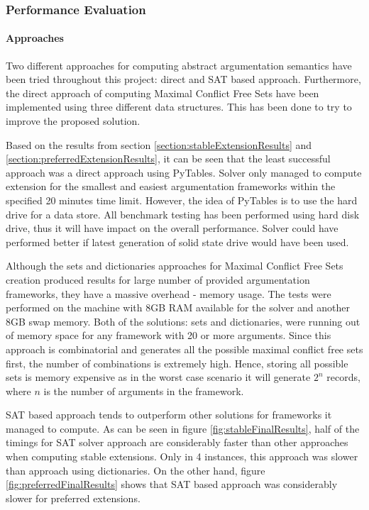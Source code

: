 \subsubsection{Performance Evaluation}

\paragraph{Approaches} 
Two different approaches for computing abstract argumentation semantics have been tried throughout this project: direct and SAT based approach. Furthermore, the direct approach of computing Maximal Conflict Free Sets have been implemented using three different data structures. This has been done to try to improve the proposed solution. 

Based on the results from section \ref{section:stableExtensionResults} and \ref{section:preferredExtensionResults}, it can be seen that the least successful approach was a direct approach using PyTables. Solver only managed to compute extension for the smallest and easiest argumentation frameworks within the specified 20 minutes time limit. However, the idea of PyTables is to use the hard drive for a data store. All benchmark testing has been performed using hard disk drive, thus it will have impact on the overall performance. Solver could have performed better if latest generation of solid state drive would have been used. 

Although the sets and dictionaries approaches for Maximal Conflict Free Sets creation produced results for large number of provided argumentation frameworks, they have a massive overhead - memory usage. The tests were performed on the machine with 8GB RAM available for the solver and another 8GB swap memory. Both of the solutions: sets and dictionaries, were running out of memory space for any framework with 20 or more arguments. Since this approach is combinatorial and  generates all the possible maximal conflict free sets first, the number of combinations is extremely high. Hence, storing all possible sets is memory expensive as in the worst case scenario it will generate $2^n$ records, where $n$ is the number of arguments in the framework.

SAT based approach tends to outperform other solutions for frameworks it managed to compute. As can be seen in figure \ref{fig:stableFinalResults}, half of the timings for SAT solver approach are considerably faster than other approaches when computing stable extensions. Only in 4 instances, this approach was slower than approach using dictionaries. On the other hand, figure \ref{fig:preferredFinalResults} shows that SAT based approach was considerably slower for preferred extensions. 

